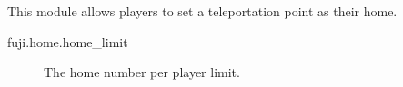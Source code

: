 
This module allows players to set a teleportation point as their home.


\begin{description}
    \item [fuji.home.home\_limit] The home number per player limit.
\end{description}

